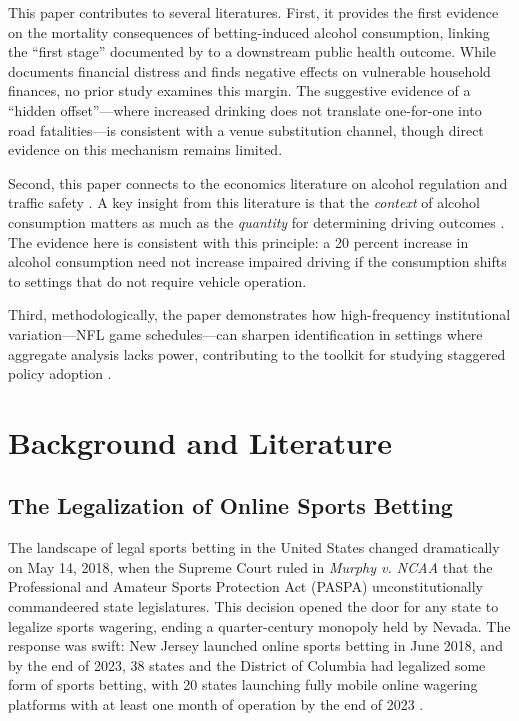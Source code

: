 \documentclass[12pt]{article}
\begin{document}
This paper contributes to several literatures. First, it provides the first evidence on the mortality consequences of betting-induced alcohol consumption, linking the ``first stage'' documented by \citet{taylor2024betting} to a downstream public health outcome. While \citet{hollenbeck2025financial} documents financial distress and \citet{baker2024vulnerable} finds negative effects on vulnerable household finances, no prior study examines this margin. The suggestive evidence of a ``hidden offset''---where increased drinking does not translate one-for-one into road fatalities---is consistent with a venue substitution channel, though direct evidence on this mechanism remains limited.

Second, this paper connects to the economics literature on alcohol regulation and traffic safety \citep{dee1999state, carpenter2011effect, carpenter2004new, hansen2015punishment}. A key insight from this literature is that the \emph{context} of alcohol consumption matters as much as the \emph{quantity} for determining driving outcomes \citep{heaton2012sunday, cook2007drinking}. The evidence here is consistent with this principle: a 20 percent increase in alcohol consumption need not increase impaired driving if the consumption shifts to settings that do not require vehicle operation.

Third, methodologically, the paper demonstrates how high-frequency institutional variation---NFL game schedules---can sharpen identification in settings where aggregate analysis lacks power, contributing to the toolkit for studying staggered policy adoption \citep{roth2023whats, callaway2021difference, goodmanbacon2021difference}.


\section{Background and Literature}
\label{sec:background}

\subsection{The Legalization of Online Sports Betting}

The landscape of legal sports betting in the United States changed dramatically on May 14, 2018, when the Supreme Court ruled in \emph{Murphy v. NCAA} that the Professional and Amateur Sports Protection Act (PASPA) unconstitutionally commandeered state legislatures. This decision opened the door for any state to legalize sports wagering, ending a quarter-century monopoly held by Nevada. The response was swift: New Jersey launched online sports betting in June 2018, and by the end of 2023, 38 states and the District of Columbia had legalized some form of sports betting, with 20 states launching fully mobile online wagering platforms with at least one month of operation by the end of 2023 \citep{murphy2024paspa}.
\end{document}
